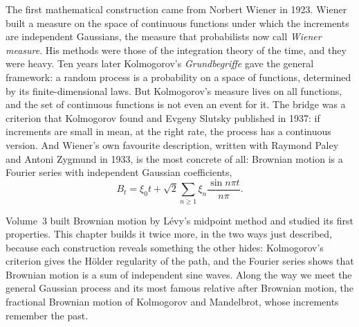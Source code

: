 The first mathematical construction came from Norbert Wiener in 1923. Wiener built a measure on the space of continuous functions under which the increments are
independent Gaussians, the measure that probabilists now call \emph{Wiener measure}. His methods were those of the integration theory of the time, and they were
heavy. Ten years later Kolmogorov's \emph{Grundbegriffe} gave the general framework: a random process is a probability on a space of functions, determined by its
finite-dimensional laws. But Kolmogorov's measure lives on all functions, and the set of continuous functions is not even an event for it. The bridge was a
criterion that Kolmogorov found and Evgeny Slutsky published in 1937: if increments are small in mean, at the right rate, the process has a continuous version.
And Wiener's own favourite description, written with Raymond Paley and Antoni Zygmund in 1933, is the most concrete of all: Brownian motion is a Fourier series
with independent Gaussian coefficients,
\[B_t=\xi_0t+\sqrt2\sum_{n\ge1}\xi_n\frac{\sin n\pi t}{n\pi}.\]

Volume~3 built Brownian motion by L\'evy's midpoint method and studied its first properties. This chapter builds it twice more, in the two ways just described,
because each construction reveals something the other hides: Kolmogorov's criterion gives the H\"older regularity of the path, and the Fourier series shows
that Brownian motion is a sum of independent sine waves. Along the way we meet the general Gaussian process and its most famous relative after Brownian motion,
the fractional Brownian motion of Kolmogorov and Mandelbrot, whose increments remember the past.

